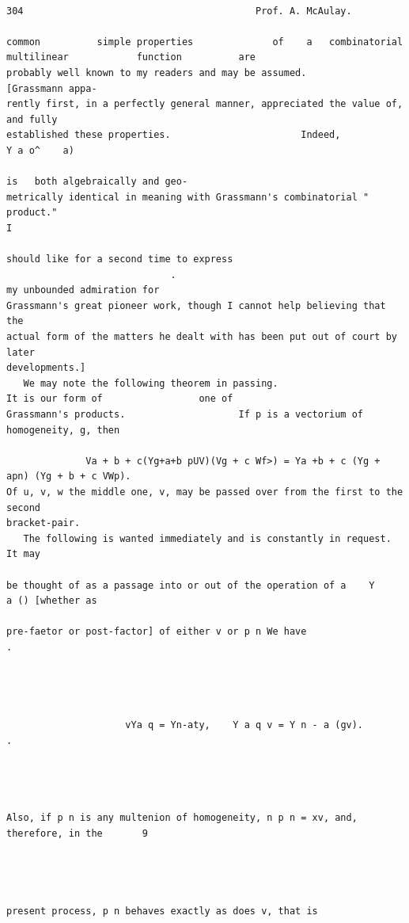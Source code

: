 \documentclass[10pt]{article}
\begin{document}
\begin{verbatim}

304                                         Prof. A. McAulay.

common          simple properties              of    a   combinatorial                              multilinear            function          are
probably well known to my readers and may be assumed.                                                         [Grassmann appa-
rently first, in a perfectly general manner, appreciated the value of, and fully
established these properties.                       Indeed,             Y a o^    a)
                                                                                       is   both algebraically and geo-
metrically identical in meaning with Grassmann's combinatorial " product."                                                                     I

should like for a second time to express
                             .                                                         my unbounded admiration for
Grassmann's great pioneer work, though I cannot help believing that the
actual form of the matters he dealt with has been put out of court by later
developments.]
   We may note the following theorem in passing.                                                      It is our form of                 one of
Grassmann's products.                    If p is a vectorium of homogeneity, g, then

              Va + b + c(Yg+a+b pUV)(Vg + c Wf>) = Ya +b + c (Yg + apn) (Yg + b + c VWp).
Of u, v, w the middle one, v, may be passed over from the first to the second
bracket-pair.
   The following is wanted immediately and is constantly in request.                                                                 It may

be thought of as a passage into or out of the operation of a    Y                                                     a () [whether as

pre-faetor or post-factor] of either v or p n We have                    .




                     vYa q = Yn-aty,    Y a q v = Y n - a (gv).               .




Also, if p n is any multenion of homogeneity, n p n = xv, and, therefore, in the       9




present process, p n behaves exactly as does v, that is


\end{verbatim}
\end{document}
